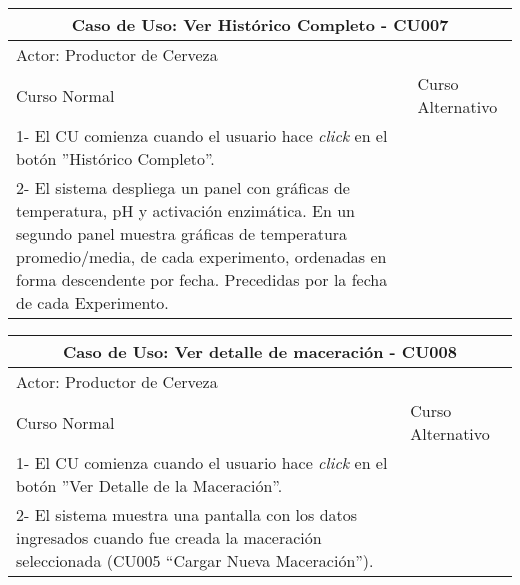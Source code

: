     
    \begin{minipage}{0.95\textwidth}
    \begin{center}
    \begin{tabularx}{\textwidth}{ | X | X |}
        \hline
        \multicolumn{2}{|c|}{\textbf{Caso de Uso: Ver Histórico Completo - CU007}} \\
        \hline
        \multicolumn{2}{|l|}{Actor: Productor de Cerveza} \\
        \hline
        Curso Normal & Curso Alternativo \\
        \hline
        1- El CU comienza cuando el usuario hace \textit{click} en el botón ”Histórico Completo”. & \\
        \hline
        2- El sistema despliega un panel con gráficas de temperatura, pH y activación enzimática. En un segundo panel muestra gráficas de temperatura promedio/media, de cada experimento, ordenadas en forma descendente por fecha. Precedidas por la fecha de cada Experimento. & 
        \\
        \hline
    \end{tabularx}
    \label{CU007}
    \end{center}
    \end{minipage}
    
    
    \begin{minipage}{0.95\textwidth}
    \begin{center}
    \begin{tabularx}{\textwidth}{ | X | X |}
        \hline
        \multicolumn{2}{|c|}{\textbf{Caso de Uso: Ver detalle de maceración - CU008}} \\
        \hline
        \multicolumn{2}{|l|}{Actor: Productor de Cerveza} \\
        \hline
        Curso Normal & Curso Alternativo \\
        \hline
        1- El CU comienza cuando el usuario hace \textit{click} en el botón ”Ver Detalle de la Maceración”. & \\
        \hline
        2- El sistema muestra una pantalla con los datos ingresados cuando fue creada la maceración seleccionada (CU005 “Cargar Nueva Maceración”). & 
        \\
        \hline
    \end{tabularx}
    \label{CU008}
    \end{center}
    \end{minipage}
    
